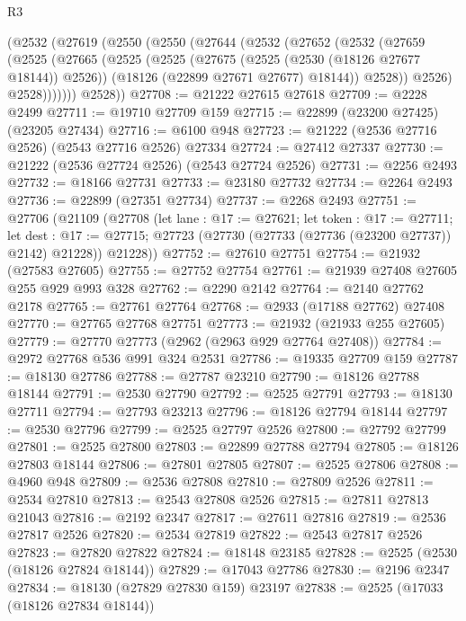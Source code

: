 \begin{lexlean}{R3}
\begin{coremodule}
    (@2532
      (@27619
        (@2550
          (@2550
            (@27644
              (@2532
                (@27652
                  (@2532
                    (@27659
                      (@2525
                        (@27665
                          (@2525
                            (@2525
                              (@27675 (@2525 (@2530 (@18126 @27677 @18144)) @2526))
                              (@18126 (@22899 @27671 @27677) @18144))
                            @2528))
                        @2526)
                      @2528)))))))
        @2528))
@27708 := @21222 @27615 @27618
@27709 := @2228 @2499
@27711 := @19710 @27709 @159
@27715 := @22899 (@23200 @27425) (@23205 @27434)
@27716 := @6100 @948
@27723 := @21222 (@2536 @27716 @2526) (@2543 @27716 @2526) @27334
@27724 := @27412 @27337
@27730 := @21222 (@2536 @27724 @2526) (@2543 @27724 @2526)
@27731 := @2256 @2493
@27732 := @18166 @27731
@27733 := @23180 @27732
@27734 := @2264 @2493
@27736 := @22899 (@27351 @27734)
@27737 := @2268 @2493
@27751 := @27706
    (@21109
      (@27708
        (let lane : @17 := @27621;
        let token : @17 := @27711;
        let dest : @17 := @27715; @27723 (@27730 (@27733 (@27736 (@23200 @27737)) @2142) @21228))
        @21228))
@27752 := @27610 @27751
@27754 := @21932 (@27583 @27605)
@27755 := @27752 @27754
@27761 := @21939 @27408 @27605 @255 @929 @993 @328
@27762 := @2290 @2142
@27764 := @2140 @27762 @2178
@27765 := @27761 @27764
@27768 := @2933 (@17188 @27762) @27408
@27770 := @27765 @27768 @27751
@27773 := @21932 (@21933 @255 @27605)
@27779 := @27770 @27773 (@2962 (@2963 @929 @27764 @27408))
@27784 := @2972 @27768 @536 @991 @324 @2531
@27786 := @19335 @27709 @159
@27787 := @18130 @27786
@27788 := @27787 @23210
@27790 := @18126 @27788 @18144
@27791 := @2530 @27790
@27792 := @2525 @27791
@27793 := @18130 @27711
@27794 := @27793 @23213
@27796 := @18126 @27794 @18144
@27797 := @2530 @27796
@27799 := @2525 @27797 @2526
@27800 := @27792 @27799
@27801 := @2525 @27800
@27803 := @22899 @27788 @27794
@27805 := @18126 @27803 @18144
@27806 := @27801 @27805
@27807 := @2525 @27806
@27808 := @4960 @948
@27809 := @2536 @27808
@27810 := @27809 @2526
@27811 := @2534 @27810
@27813 := @2543 @27808 @2526
@27815 := @27811 @27813 @21043
@27816 := @2192 @2347
@27817 := @27611 @27816
@27819 := @2536 @27817 @2526
@27820 := @2534 @27819
@27822 := @2543 @27817 @2526
@27823 := @27820 @27822
@27824 := @18148 @23185
@27828 := @2525 (@2530 (@18126 @27824 @18144))
@27829 := @17043 @27786
@27830 := @2196 @2347
@27834 := @18130 (@27829 @27830 @159) @23197
@27838 := @2525 (@17033 (@18126 @27834 @18144))

\end{coremodule}
\end{lexlean}
